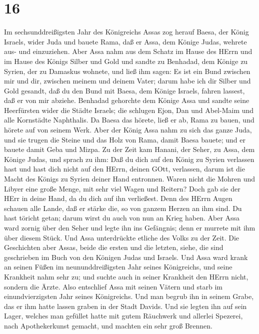 \hypertarget{section-15}{%
\section{16}\label{section-15}}

 Im sechsunddreißigsten Jahr des Königreichs Assas zog
herauf Baesa, der König Israels, wider Juda und bauete Rama, daß er
Assa, dem Könige Judas, wehrete aus- und einzuziehen.  Aber
Assa nahm aus dem Schatz im Hause des HErrn und im Hause des Königs
Silber und Gold und sandte zu Benhadad, dem Könige zu Syrien, der zu
Damaskus wohnete, und ließ ihm sagen:  Es ist ein Bund
zwischen mir und dir, zwischen meinem und deinem Vater; darum habe ich
dir Silber und Gold gesandt, daß du den Bund mit Baesa, dem Könige
Israels, fahren lassest, daß er von mir abziehe.  Benhadad
gehorchte dem Könige Assa und sandte seine Heerfürsten wider die Städte
Israels; die schlugen Ejon, Dan und Abel-Maim und alle Kornstädte
Naphthalis.  Da Baesa das hörete, ließ er ab, Rama zu bauen,
und hörete auf von seinem Werk.  Aber der König Assa nahm zu
sich das ganze Juda, und sie trugen die Steine und das Holz von Rama,
damit Baesa bauete; und er bauete damit Geba und Mizpa.  Zu
der Zeit kam Hanani, der Seher, zu Assa, dem Könige Judas, und sprach zu
ihm: Daß du dich auf den König zu Syrien verlassen hast und hast dich
nicht auf den HErrn, deinen GOtt, verlassen, darum ist die Macht des
Königs zu Syrien deiner Hand entronnen.  Waren nicht die
Mohren und Libyer eine große Menge, mit sehr viel Wagen und Reitern?
Doch gab sie der HErr in deine Hand, da du dich auf ihn verließest.
 Denn des HErrn Augen schauen alle Lande, daß er stärke die,
so von ganzem Herzen an ihm sind. Du hast töricht getan; darum wirst du
auch von nun an Krieg haben.  Aber Assa ward zornig über
den Seher und legte ihn ins Gefängnis; denn er murrete mit ihm über
diesem Stück. Und Assa unterdrückte etliche des Volks zu der Zeit.
 Die Geschichten aber Assas, beide die ersten und die
letzten, siehe, die sind geschrieben im Buch von den Königen Judas und
Israels.  Und Assa ward krank an seinen Füßen im
neununddreißigsten Jahr seines Königreichs, und seine Krankheit nahm
sehr zu; und suchte auch in seiner Krankheit den HErrn nicht, sondern
die Ärzte.  Also entschlief Assa mit seinen Vätern und
starb im einundvierzigsten Jahr seines Königreichs.  Und
man begrub ihn in seinem Grabe, das er ihm hatte lassen graben in der
Stadt Davids. Und sie legten ihn auf sein Lager, welches man gefüllet
hatte mit gutem Räuchwerk und allerlei Spezerei, nach Apothekerkunst
gemacht, und machten ein sehr groß Brennen.

